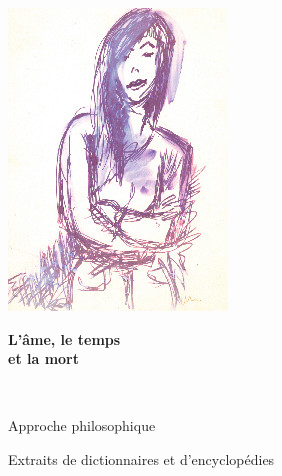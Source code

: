 \begin{titlepage}
%


\begin{center}
\includegraphics[scale=0.7]{./presentation/mort2}
\end{center}


\HRule

\begin{center}
{\huge \bfseries  L'âme, le temps \\
et la mort\\[0.4cm] }
\end{center}

\HRule \\[1.5cm]


\begin{minipage}{0.4\textwidth}
\begin{flushleft} \large
Approche philosophique
\end{flushleft}
\end{minipage}
\begin{minipage}{0.4\textwidth}
\begin{flushright} \large
\end{flushright}
\end{minipage}

\vfill


\begin{minipage}{0.4\textwidth}
\begin{flushleft} \large
\end{flushleft}
\end{minipage}
\begin{minipage}{0.4\textwidth}
\begin{flushright} \large
Extraits de dictionnaires et d'encyclopédies
\end{flushright}
\end{minipage}


\end{titlepage}
